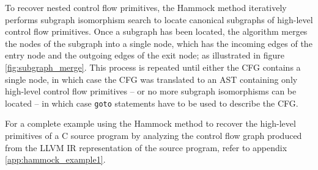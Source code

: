 To recover nested control flow primitives, the Hammock method iteratively performs subgraph isomorphism search to locate canonical subgraphs of high-level control flow primitives. Once a subgraph has been located, the algorithm merges the nodes of the subgraph into a single node, which has the incoming edges of the entry node and the outgoing edges of the exit node; as illustrated in figure \ref{fig:subgraph_merge}. This process is repeated until either the CFG contains a single node, in which case the CFG was translated to an AST containing only high-level control flow primitives -- or no more subgraph isomorphisms can be located -- in which case \texttt{goto} statements have to be used to describe the CFG.

For a complete example using the Hammock method to recover the high-level primitives of a C source program by analyzing the control flow graph produced from the LLVM IR representation of the source program, refer to appendix \ref{app:hammock_example1}.



